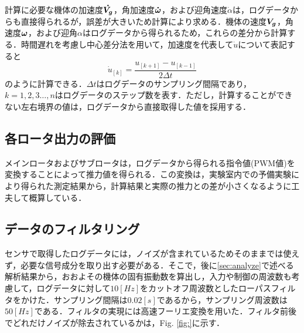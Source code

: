 計算に必要な機体の加速度$\mbox{\boldmath $\dot{V_g}$}$，角加速度$\mbox{\boldmath $\dot{\omega}$}$，および迎角速度$\dot{\alpha}$は，ログデータからも直接得られるが，誤差が大きいため計算により求める．機体の速度$\mbox{\boldmath $V_g$}$，角速度$\mbox{\boldmath $\omega$}$，および迎角$\alpha$はログデータから得られるため，これらの差分から計算する．時間遅れを考慮し中心差分法を用いて，加速度を代表して$\dot{u}$について表記すると
\begin{equation}
  \dot{u}_{[k]} = \dfrac{u_{[k+1]}-u_{[k-1]}}{2\Delta t}
\end{equation}
のように計算できる．$\Delta t$はログデータのサンプリング間隔であり，$k=1,2,3\hdots,n$はログデータのステップ数を表す．ただし，計算することができない左右境界の値は，ログデータから直接取得した値を採用する．

\subsection{各ロータ出力の評価}

メインロータおよびサブロータは，ログデータから得られる指令値(PWM値)を変換することによって推力値を得られる．この変換は，実験室内での予備実験により得られた測定結果から，計算結果と実際の推力との差が小さくなるように工夫して概算している．\cite{}

\subsection{データのフィルタリング}

センサで取得したログデータには，ノイズが含まれているためそのままでは使えず，必要な信号成分を取り出す必要がある．そこで，後に\ref{sec:analyze}で述べる解析結果から，おおよその機体の固有振動数を算出し，入力や制御の周波数も考慮して，ログデータに対して$10[Hz]$をカットオフ周波数としたローパスフィルタをかけた．サンプリング間隔は$0.02[s]$であるから，サンプリング周波数は$50[Hz]$である．フィルタの実現には高速フーリエ変換を用いた．フィルタ前後でどれだけノイズが除去されているかは，Fig. \ref{fig:}に示す．





